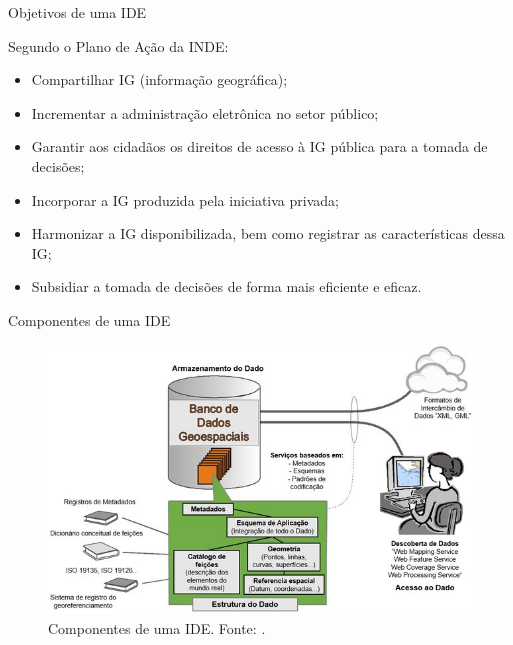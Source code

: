 \documentclass[9pt,ignorenonframetext,]{beamer}
\providecommand{\tightlist}{%
  \setlength{\itemsep}{0pt}\setlength{\parskip}{0pt}}
\begin{document}
\begin{frame}{Objetivos de uma IDE}
\protect\hypertarget{objetivos-de-uma-ide}{}

Segundo o Plano de Ação da INDE:

\begin{itemize}[<+->]
\tightlist
\item
  Compartilhar IG (informação geográfica);
\item
  Incrementar a administração eletrônica no setor público;
\item
  Garantir aos cidadãos os direitos de acesso à IG pública para a tomada
  de decisões;
\item
  Incorporar a IG produzida pela iniciativa privada;
\item
  Harmonizar a IG disponibilizada, bem como registrar as características
  dessa IG;
\item
  Subsidiar a tomada de decisões de forma mais eficiente e eficaz.
\end{itemize}

\end{frame}

\begin{frame}{Componentes de uma IDE}
\protect\hypertarget{componentes-de-uma-ide}{}

\begin{figure}[H]

{\centering \includegraphics[width=0.7\linewidth]{Figura-2-Componentes-principais-de-uma-IDE_W640} 

}

\caption{Componentes de uma IDE. Fonte: \textcite{IDEM}.}\label{fig:unnamed-chunk-1}
\end{figure}

\end{frame}
\end{document}
